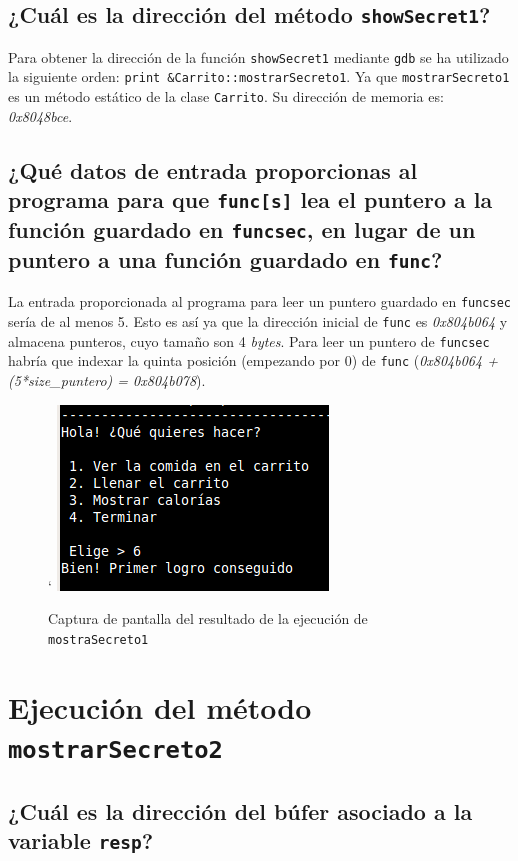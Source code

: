 \documentclass[10pt,a4paper]{article}
\begin{document}
\subsection{¿Cuál es la dirección del método \texttt{showSecret1}?}

Para obtener la dirección de la función \texttt{showSecret1} mediante \texttt{gdb} se ha utilizado la siguiente orden: \texttt{print \&{}Carrito::mostrarSecreto1}. Ya que \texttt{mostrarSecreto1} es un método estático de la clase \texttt{Carrito}. Su dirección de memoria es: \emph{0x8048bce}.


\subsection{¿Qué datos de entrada proporcionas al programa para que \texttt{func[s]} lea el puntero a la función guardado en \texttt{funcsec}, en lugar de un puntero a una función guardado en \texttt{func}?}

La entrada proporcionada al programa para leer un puntero guardado en \texttt{funcsec} sería de al menos 5. Esto es así ya que la dirección inicial de \texttt{func} es \emph{0x804b064} y almacena punteros, cuyo tamaño son 4 \emph{bytes}. Para leer un puntero de \texttt{funcsec} habría que indexar la quinta posición (empezando por 0) de \texttt{func} (\emph{0x804b064 + (5*size\_{}puntero) = 0x804b078}).\\

\begin{figure}[h!]`
\centering
\includegraphics[scale=0.8]{images/primer_logro.png}
\caption{Captura de pantalla del resultado de la ejecución de \texttt{mostraSecreto1}}
\label{fig:mostrarSecreto1}
\end{figure}


\section{Ejecución del método \texttt{mostrarSecreto2}}

\subsection{¿Cuál es la dirección del búfer asociado a la variable \texttt{resp}?}
\end{document}

